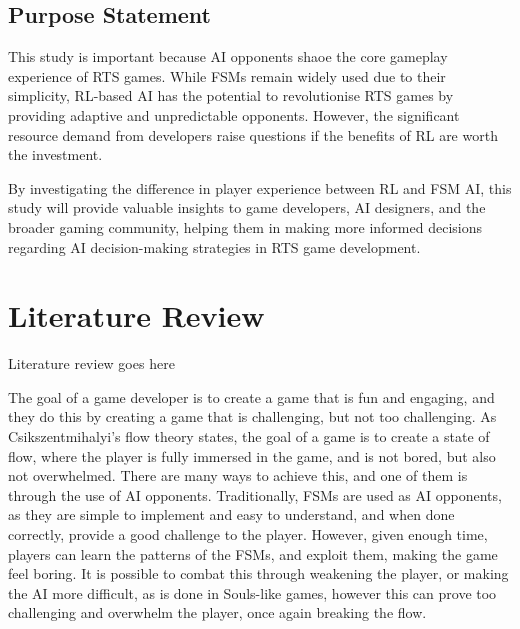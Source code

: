 \documentclass[conference]{IEEEtran}
\begin{document}
\subsection{Purpose Statement}

This study is important because AI opponents shaoe the core gameplay experience of RTS games. While FSMs remain widely used due to their simplicity, RL-based AI has the potential to revolutionise
RTS games by providing adaptive and unpredictable opponents. However, the significant resource demand from developers raise questions if the benefits of RL are worth the investment.

By investigating the difference in player experience between RL and FSM AI, this study will provide valuable insights to game developers, AI designers, and the broader gaming community, helping them
in making more informed decisions regarding AI decision-making strategies in RTS game development.

\section{Literature Review}



Literature review goes here


The goal of a game developer is to create a game that is fun and engaging, and they do this by creating a game that is challenging, but not too challenging.
As Csikszentmihalyi's flow theory states, the goal of a game is to create a state of flow, where the player is fully immersed in the game, and is not
bored, but also not overwhelmed. There are many ways to achieve this, and one of them is through the use of AI opponents. Traditionally, FSMs are
used as AI opponents, as they are simple to implement and easy to understand, and when done correctly, provide a good challenge to the player.
However, given enough time, players can learn the patterns of the FSMs, and exploit them, making the game feel boring. It is possible to combat this
through weakening the player, or making the AI more difficult, as is done in Souls-like games, however this can prove too challenging and overwhelm the player,
once again breaking the flow. 
\end{document}
